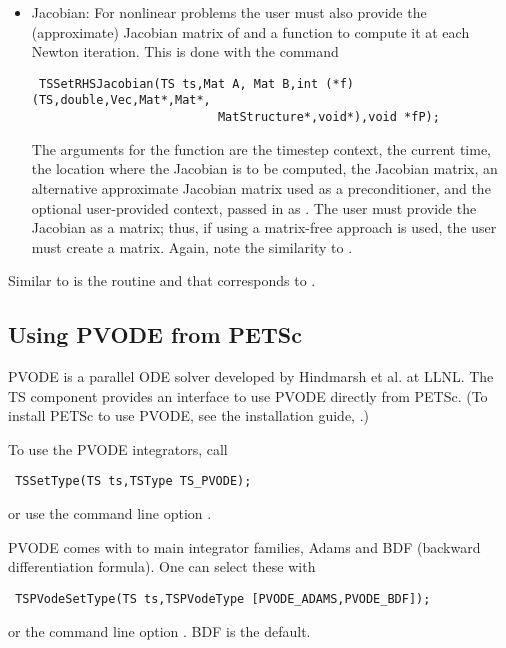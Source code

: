 \begin{itemize}
\item Jacobian: For nonlinear problems the user must also provide the 
(approximate) Jacobian matrix of  and a function to
compute it at each Newton iteration. This is done with the command
\begin{verbatim}
 TSSetRHSJacobian(TS ts,Mat A, Mat B,int (*f)(TS,double,Vec,Mat*,Mat*,
                          MatStructure*,void*),void *fP);
\end{verbatim}
The  arguments for the function  are
the timestep context, the current time, the location where the
Jacobian is to be computed, the Jacobian matrix, an alternative
approximate Jacobian matrix used as a preconditioner, and the optional
user-provided context, passed in as . The user must provide the 
Jacobian as a matrix; thus, if using a matrix-free approach is used, the
user must create a  matrix. Again, note the similarity
to . 
\end{itemize}

Similar to  is the
routine  and  that 
corresponds to . 
 

\subsection{Using PVODE from PETSc}

PVODE is a parallel ODE solver developed by Hindmarsh et al. at LLNL.
The TS component provides an interface to use PVODE directly from PETSc.
(To install PETSc to use PVODE, see the installation guide, .) 

To use the PVODE integrators, call 
\begin{verbatim}
 TSSetType(TS ts,TSType TS_PVODE);
\end{verbatim}
or use the command line option .  
  

PVODE comes with to main integrator families, Adams and BDF (backward 
differentiation formula). One can select these with 
\begin{verbatim}
 TSPVodeSetType(TS ts,TSPVodeType [PVODE_ADAMS,PVODE_BDF]);
\end{verbatim}
or the command line option . BDF is
the default.  
  

